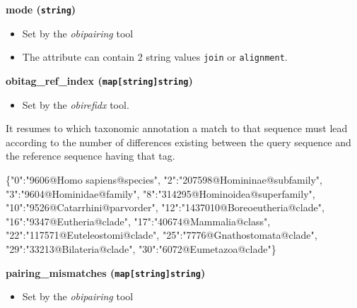 \documentclass[
  letterpaper,
  DIV=11,
  numbers=noendperiod]{scrreprt}
\newenvironment{Shaded}{\begin{snugshade}}{\end{snugshade}}
\newcommand{\DataTypeTok}[1]{\textcolor[rgb]{0.68,0.00,0.00}{#1}}
\newcommand{\FunctionTok}[1]{\textcolor[rgb]{0.28,0.35,0.67}{#1}}
\newcommand{\StringTok}[1]{\textcolor[rgb]{0.13,0.47,0.30}{#1}}
\providecommand{\tightlist}{%
  \setlength{\itemsep}{0pt}\setlength{\parskip}{0pt}}\usepackage{longtable,booktabs,array}
\begin{document}
\textbf{mode (\texttt{string})}

\begin{itemize}
\tightlist
\item
  Set by the \emph{obipairing} tool
\item
  The attribute can contain 2 string values \texttt{join} or
  \texttt{alignment}.
\end{itemize}

\textbf{obitag\_ref\_index (\texttt{map{[}string{]}string})}

\begin{itemize}
\tightlist
\item
  Set by the \emph{obirefidx} tool.
\end{itemize}

It resumes to which taxonomic annotation a match to that sequence must
lead according to the number of differences existing between the query
sequence and the reference sequence having that tag.

\begin{Shaded}
\begin{Highlighting}[]
   \FunctionTok{\{}\DataTypeTok{"0"}\FunctionTok{:}\StringTok{"9606@Homo sapiens@species"}\FunctionTok{,}
    \DataTypeTok{"2"}\FunctionTok{:}\StringTok{"207598@Homininae@subfamily"}\FunctionTok{,}
    \DataTypeTok{"3"}\FunctionTok{:}\StringTok{"9604@Hominidae@family"}\FunctionTok{,}
    \DataTypeTok{"8"}\FunctionTok{:}\StringTok{"314295@Hominoidea@superfamily"}\FunctionTok{,}
    \DataTypeTok{"10"}\FunctionTok{:}\StringTok{"9526@Catarrhini@parvorder"}\FunctionTok{,}
    \DataTypeTok{"12"}\FunctionTok{:}\StringTok{"1437010@Boreoeutheria@clade"}\FunctionTok{,}
    \DataTypeTok{"16"}\FunctionTok{:}\StringTok{"9347@Eutheria@clade"}\FunctionTok{,}
    \DataTypeTok{"17"}\FunctionTok{:}\StringTok{"40674@Mammalia@class"}\FunctionTok{,}
    \DataTypeTok{"22"}\FunctionTok{:}\StringTok{"117571@Euteleostomi@clade"}\FunctionTok{,}
    \DataTypeTok{"25"}\FunctionTok{:}\StringTok{"7776@Gnathostomata@clade"}\FunctionTok{,}
    \DataTypeTok{"29"}\FunctionTok{:}\StringTok{"33213@Bilateria@clade"}\FunctionTok{,}
    \DataTypeTok{"30"}\FunctionTok{:}\StringTok{"6072@Eumetazoa@clade"}\FunctionTok{\}}
\end{Highlighting}
\end{Shaded}

\textbf{pairing\_mismatches (\texttt{map{[}string{]}string})}

\begin{itemize}
\tightlist
\item
  Set by the \emph{obipairing} tool
\end{itemize}
\end{document}
